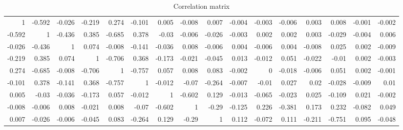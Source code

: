 \documentclass[12pt]{amsart}
\begin{document}
\begin{table}[h]\tiny
\caption{Correlation matrix}
	\begin{center}
		\begin{tabular}{r r r r r r r r r r r r r r r r}
			             1   &    -0.592   &    -0.026   &    -0.219   &     0.274   &    -0.101   &     0.005   &    -0.008   &     0.007   &    -0.004   &    -0.003   &    -0.006   &     0.003   &     0.008   &    -0.001   &    -0.002     \\
-0.592   &         1   &    -0.436   &     0.385   &    -0.685   &     0.378   &     -0.03   &    -0.006   &    -0.026   &    -0.003   &     0.002   &     0.002   &     0.003   &    -0.029   &    -0.004   &     0.006     \\
-0.026   &    -0.436   &         1   &     0.074   &    -0.008   &    -0.141   &    -0.036   &     0.008   &    -0.006   &     0.004   &    -0.006   &     0.004   &    -0.008   &     0.025   &     0.002   &    -0.009     \\
-0.219   &     0.385   &     0.074   &         1   &    -0.706   &     0.368   &    -0.173   &    -0.021   &    -0.045   &     0.013   &    -0.012   &     0.051   &    -0.022   &     -0.01   &     0.002   &    -0.003     \\
 0.274   &    -0.685   &    -0.008   &    -0.706   &         1   &    -0.757   &     0.057   &     0.008   &     0.083   &    -0.002   &         0   &    -0.018   &    -0.006   &     0.051   &     0.002   &    -0.001     \\
-0.101   &     0.378   &    -0.141   &     0.368   &    -0.757   &         1   &    -0.012   &     -0.07   &    -0.264   &    -0.007   &     -0.01   &     0.027   &      0.02   &    -0.028   &    -0.009   &      0.01     \\
 0.005   &     -0.03   &    -0.036   &    -0.173   &     0.057   &    -0.012   &         1   &    -0.602   &     0.129   &    -0.013   &    -0.065   &    -0.023   &     0.025   &    -0.109   &     0.021   &    -0.002     \\
-0.008   &    -0.006   &     0.008   &    -0.021   &     0.008   &     -0.07   &    -0.602   &         1   &     -0.29   &    -0.125   &     0.226   &    -0.381   &     0.173   &     0.232   &    -0.082   &     0.049     \\
 0.007   &    -0.026   &    -0.006   &    -0.045   &     0.083   &    -0.264   &     0.129   &     -0.29   &         1   &     0.112   &    -0.072   &     0.111   &    -0.211   &    -0.751   &     0.095   &    -0.048     \\

\end{tabular}
\end{center}
\end{table}
\end{document}
